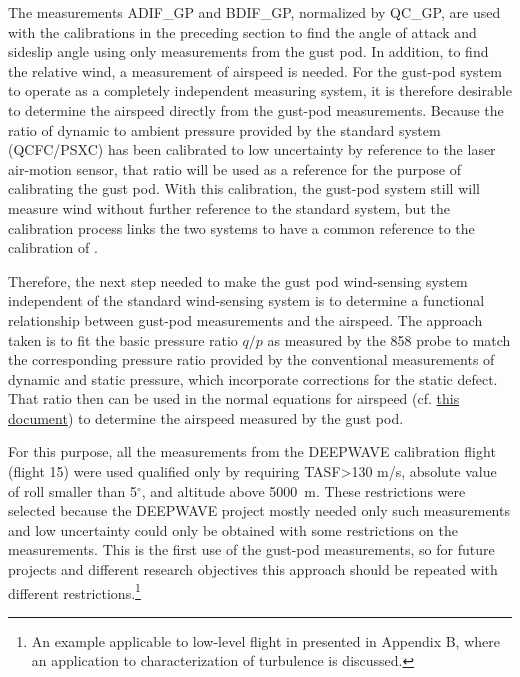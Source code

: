 \documentclass[12pt,twoside,english]{article}\usepackage[]{graphicx}\usepackage[]{color}
\let\OrgIndex\index
\renewcommand*{\index}[1]{\OrgIndex{#1}}
\begin{document}
{{The measurements ADIF\_GP and BDIF\_GP, normalized by QC\_GP, are used with the calibrations in the preceding section to find the angle of attack and sideslip angle using only measurements from the gust pod. In addition, to find the relative wind, a measurement of airspeed is needed. For the gust-pod system to operate as a completely independent measuring system, it is therefore desirable to determine the  airspeed directly from the gust-pod measurements. Because the ratio of dynamic to ambient pressure provided by the standard system (QCFC/PSXC) has been calibrated to low uncertainty by reference to the laser air-motion sensor, that ratio will be used as a reference for the purpose of calibrating the gust pod. With this calibration, the gust-pod system still will measure wind without further reference to the standard system, but the calibration process links the two systems to have a common reference to the calibration of \citet{CooperEtAl2014}. 

Therefore, the next step needed to make the gust pod wind-sensing system independent of the standard wind-sensing system is to determine a functional relationship between gust-pod measurements and the airspeed. The approach taken is to fit the basic pressure ratio $q/p$ as measured by the 858 probe to match the corresponding pressure ratio provided by the conventional measurements of dynamic and static pressure, which incorporate corrections for the static defect. That ratio then can be used in the normal equations for airspeed (cf. \href{https://drive.google.com/open?id=0B1kIUH45ca5Ab2Z6cld1M1cydjA&authuser=0}{this document}) to determine the airspeed measured by the gust pod. 

For this purpose, all the measurements from the DEEPWAVE calibration flight (flight 15) were used qualified only by requiring TASF>130 m/s, absolute value of roll smaller than 5$^{\circ}$, and altitude above 5000~m. These restrictions were selected because the DEEPWAVE project mostly needed only such measurements and low uncertainty could only be obtained with some restrictions on the measurements. This is the first use of the gust-pod measurements, so for future projects and different research objectives this approach should be repeated with different restrictions.\footnote{An example applicable to low-level flight in presented in Appendix B, where an application to characterization of turbulence is discussed.} 



}}
\end{document}
